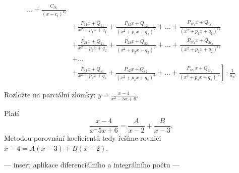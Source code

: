 \begin{veta}
\begin{align*}
              \dots + \frac{C_{lk_l}}{(x-c_l)^{k_l}} \\
          & + \frac{P_{11}x + Q_{11}}{x^2 + p_1x + q_1}
              + \frac{P_{12}x + Q_{12}}{(x^2 + p_1x + q_1)^2} + \dots
              + \frac{P_{1r_1}x + Q_{1r_1}}{(x^2 + p_1x + q_1)^{r_1}} \\
          & + \frac{P_{21}x + Q_{21}}{x^2 + p_2x + q_2}
              + \frac{P_{22}x + Q_{22}}{(x^2 + p_2x + q_2)^2} + \dots
              + \frac{P_{2r_2}x + Q_{2r_2}}{(x^2 + p_2x + q_2)^{r_2}} \\
          & + \dots \\
          & + \left . \frac{P_{s1}x + Q_{s1}}{x^2 + p_sx + q_s}
              + \frac{P_{s2}x + Q_{s2}}{(x^2 + p_sx + q_s)^2} + \dots
              + \frac{P_{sr_s}x + Q_{sr_s}}{(x^2 + p_sx + q_s)^{r_s}} \right ]
              \cdot \frac{1}{a_n}
    \end{align*}
\end{veta}

\begin{priklad}
Rozložte na parciální zlomky: $y=\frac{x-4}{x^2-5x+6}.$
\end{priklad}

\begin{reseni}
Platí
$$\frac{x-4}{x^-5x+6}=\frac{A}{x-2}+\frac{B}{x-3}.$$
Metodou porovnání koeficientů tedy řešíme rovnici $x-4=A(x-3)+B(x-2)$.
\end{reseni}

--- insert aplikace diferenciálního a integrálního počtu ---
